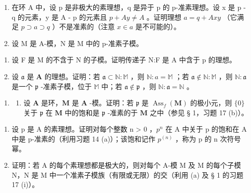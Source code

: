 \begin{enumerate}
\def\labelenumi{\arabic{enumi}.}
\setcounter{enumi}{15}
\item
  在环 A 中，设 p 是非极大的素理想，q 是异于 p 的 p-准素理想。设 x 是 p - q 的元素，y 是 A - p 的元素且 \(p + Ay \neq A\) 。证明理想 \(a = q + Axy\) （它满足 \(p \supset a \supset q\) ）不是准素的（注意 \(x \in a\) 是不可能的）。
\item
  设 M 是 A-模，N 是 M 中的 p-准素子模。
\end{enumerate}

\begin{enumerate}
\def\labelenumi{(\alph{enumi})}
\item
  设 F 是 M 的不含于 N 的子模。证明传递子 N:F 是 A 中含于 p 的理想。
\item
  设 \(\mathfrak{a}\) 是 \(\mathbf{A}\) 的理想。证明：若 \(\mathfrak{a} \subset \mathbb{N}: \mathbb{M}\) ，则 \(\mathbb{N}: a = \mathbb{M}\) ；若 \(\mathfrak{a} \notin \mathbb{N}: \mathbb{M}\) ，则 \(\mathbb{N}: \mathfrak{a}\) 是一个 \(\mathfrak{p}\) -准素子模，位于 \(\mathbb{M}\) 中；若 \(\mathfrak{a} \notin \mathfrak{p}\) ，则 \(\mathbb{N}: \mathfrak{a} = \mathbb{N}\) 。
\end{enumerate}

\begin{enumerate}
\def\labelenumi{\arabic{enumi}.}
\setcounter{enumi}{17}
\tightlist
\item
  \begin{enumerate}
  \def\labelenumii{(\alph{enumii})}
  \tightlist
  \item
    设 \(\mathbf{A}\) 是环，\(\mathbf{M}\) 是 \(\mathbf{A}\) -模。证明：若 \(\mathfrak{p}\) 是 \(\operatorname{Ass}_f(\mathbf{M})\) 的极小元，则 \(\{0\}\) 关于 \(\mathfrak{p}\) 在 \(\mathbf{M}\) 中的饱和是 \(\mathfrak{p}\) -准素的于 \(\mathbf{M}\) 之中（参见 § 1，习题 17 (b)）。
  \end{enumerate}
\end{enumerate}

\begin{enumerate}
\def\labelenumi{(\alph{enumi})}
\setcounter{enumi}{1}
\item
  设 p 是 A 的素理想。证明对每个整数 n \textgreater{} 0 ，\(p^{n}\) 在 A 中关于 p 的饱和在 A 中是 p-准素的（利用习题 14 (a)）；该饱和记作 \(p^{(n)}\) ，称为 p 的 n 次符号幂。
\item
  证明：若 A 的每个素理想都是极大的，则对每个 A-模 M 及 M 的每个子模 N，N 是 M 中一个准素子模族（有限或无限）的交（利用 (a) 及 § 1 的习题 17 (i)）。
\end{enumerate}

